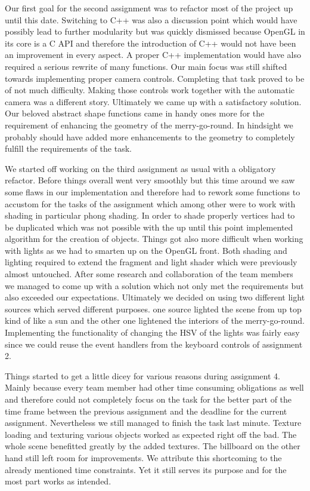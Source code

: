 \documentclass{report}
\begin{document}
Our first goal for the second assignment was to refactor most of the project up until this date. Switching to C++ was also a discussion point which would have possibly lead to further modularity but was quickly dismissed because OpenGL in its core is a C API and therefore the introduction of C++ would not have been an improvement in every aspect. A proper C++ implementation would have also required a serious rewrite of many functions. Our main focus was still shifted towards implementing proper camera controls. Completing that task proved to be of not much difficulty. Making those controls work together with the automatic camera was a different story. Ultimately we came up with a satisfactory solution. Our beloved abstract shape functions came in handy ones more for the requirement of enhancing the geometry of the merry-go-round. In hindsight we probably should have added more enhancements to the geometry to completely fulfill the requirements of the task.
\par
We started off working on the third assignment as usual with a obligatory refactor. Before things overall went very smoothly but this time around we saw some flaws in our implementation and therefore had to rework some functions to accustom for the tasks of the assignment which among other were to work with shading in particular phong shading. In order to shade properly vertices had to be duplicated which was not possible with the up until this point implemented algorithm for the creation of objects. Things got also more difficult when working with lights as we had to smarten up on the OpenGL front. Both shading and lighting required to extend the fragment and light shader which were previously almost untouched. After some research and collaboration of the team members we managed to come up with a solution which not only met the requirements but also exceeded our expectations. Ultimately we decided on using two different light sources which served different purposes. one source lighted the scene from up top kind of like a sun and the other one lightened the interiors of the merry-go-round. Implementing the functionality of changing the HSV of the lights was fairly easy since we could reuse the event handlers from the keyboard controls of assignment 2.
\par
Things started to get a little dicey for various reasons during assignment 4. Mainly because  every team member had other time consuming obligations as well and therefore could not completely focus on the task for the better part of the time frame between the previous assignment and the deadline for the current assignment. Nevertheless we still managed to finish the task last minute. Texture loading and texturing various objects worked as expected right off the bad. The whole scene benefitted greatly by the added textures. The billboard on the other hand still left room for improvements.  We attribute this shortcoming to the already mentioned time constraints. Yet it still serves its purpose and for the most part works as intended. 
\end{document}
